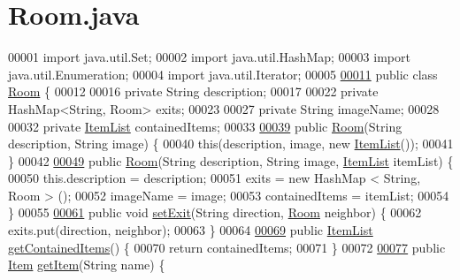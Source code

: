 \hypertarget{Room_8java_source}{\section{Room.\-java}
}

\begin{DoxyCode}
00001 \textcolor{keyword}{import} java.util.Set;
00002 \textcolor{keyword}{import} java.util.HashMap;
00003 \textcolor{keyword}{import} java.util.Enumeration;
00004 \textcolor{keyword}{import} java.util.Iterator;
00005 
\hypertarget{Room_8java_source_l00011}{}\hyperlink{classRoom}{00011} \textcolor{keyword}{public} \textcolor{keyword}{class }\hyperlink{classRoom}{Room} \{
00012 
00016     \textcolor{keyword}{private} String description;
00017 
00022     \textcolor{keyword}{private} HashMap<String, Room> exits;
00023 
00027     \textcolor{keyword}{private} String imageName;
00028 
00032     \textcolor{keyword}{private} \hyperlink{classItemList}{ItemList} containedItems;
00033 
\hypertarget{Room_8java_source_l00039}{}\hyperlink{classRoom_a2cdcbb3d86746330a5a01c7fae4de02c}{00039}     \textcolor{keyword}{public} \hyperlink{classRoom_a2cdcbb3d86746330a5a01c7fae4de02c}{Room}(String description, String image) \{
00040         \textcolor{keyword}{this}(description, image, \textcolor{keyword}{new} \hyperlink{classItemList}{ItemList}());
00041     \}
00042 
\hypertarget{Room_8java_source_l00049}{}\hyperlink{classRoom_ad8cb507b670aec86cf14baa25fadb0f2}{00049}     \textcolor{keyword}{public} \hyperlink{classRoom_ad8cb507b670aec86cf14baa25fadb0f2}{Room}(String description, String image, \hyperlink{classItemList}{ItemList} itemList) \{
00050         this.description = description;
00051         exits = \textcolor{keyword}{new} HashMap < String, Room > ();
00052         imageName = image;
00053         containedItems = itemList;
00054     \}
00055 
\hypertarget{Room_8java_source_l00061}{}\hyperlink{classRoom_ae4bc6837f331b5249beb0651fc277018}{00061}     \textcolor{keyword}{public} \textcolor{keywordtype}{void} \hyperlink{classRoom_ae4bc6837f331b5249beb0651fc277018}{setExit}(String direction, \hyperlink{classRoom}{Room} neighbor) \{
00062         exits.put(direction, neighbor);
00063     \}   
00064 
\hypertarget{Room_8java_source_l00069}{}\hyperlink{classRoom_ab9ebd5a52d437f7724bf8474fffae81f}{00069}     \textcolor{keyword}{public} \hyperlink{classItemList}{ItemList} \hyperlink{classRoom_ab9ebd5a52d437f7724bf8474fffae81f}{getContainedItems}() \{
00070         \textcolor{keywordflow}{return} containedItems;
00071     \}
00072 
\hypertarget{Room_8java_source_l00077}{}\hyperlink{classRoom_a9b53c8d9f87f4a6d9cc954aeb744d1a2}{00077}     \textcolor{keyword}{public} \hyperlink{classItem}{Item} \hyperlink{classRoom_a9b53c8d9f87f4a6d9cc954aeb744d1a2}{getItem}(String name) \{

\end{DoxyCode}
